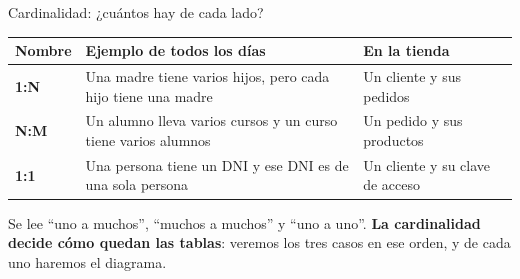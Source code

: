 \documentclass[aspectratio=169,10pt,c]{beamer}
\begin{document}
\begin{frame}{Cardinalidad: ¿cuántos hay de cada lado?}
\vspace{0.3cm}
\begin{center}
\small
\begin{tabular}{>{\bfseries}p{1.3cm}>{\raggedright\arraybackslash}p{5.1cm}>{\raggedright\arraybackslash}p{4.9cm}}
\toprule
Nombre & Ejemplo de todos los días & En la tienda \\
\midrule
1:N & Una madre tiene varios hijos, pero cada hijo tiene una madre & Un cliente y sus pedidos \\
N:M & Un alumno lleva varios cursos y un curso tiene varios alumnos & Un pedido y sus productos \\
1:1 & Una persona tiene un DNI y ese DNI es de una sola persona & Un cliente y su clave de acceso \\
\bottomrule
\end{tabular}
\end{center}
\vspace{0.25cm}
\small Se lee ``uno a muchos'', ``muchos a muchos'' y ``uno a uno''. \textbf{La cardinalidad decide cómo quedan las tablas}: veremos los tres casos en ese orden, y de cada uno haremos el diagrama.
\end{frame}
\end{document}
